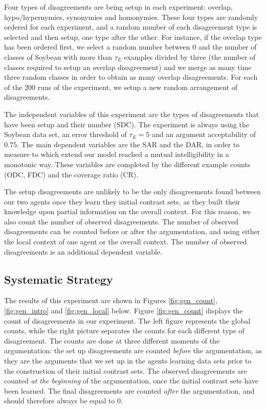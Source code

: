 Four types of disagreements are being setup in each experiment: overlap, hypo/hypernymies, synonymies and homonymies. These four types are randomly ordered for each experiment, and a random number of each disagreement type is selected and then setup, one type after the other. For instance, if the overlap type has been ordered first, we select a random number between 0 and the number of classes of Soybean with more than $\tau_{E}$ examples divided by three (the number of classes required to setup an overlap disagreement) and we merge as many time three random classes in order to obtain as many overlap disagreements. For each of the 200 runs of the experiment, we setup a new random arrangement of disagreements.

The independent variables of this experiment are the types of disagreements that have been setup and their number (SDC). The experiment is always using the Soybean data set, an error threshold of $\tau_{E} = 5$ and an argument acceptability of $0.75$.
The main dependent variables are the SAR and the DAR, in order to measure to which extend our model reached a mutual intelligibility in a monotonic way. These variables are completed by the different example counts (ODC, FDC) and the coverage ratio (CR).

The setup disagreements are unlikely to be the only disagreements found between our two agents once they learn they initial contrast sets, as they built their knowledge upon partial information on the overall context. For this reason, we also count the number of observed disagreements. The number of observed disagreements can be counted before or after the argumentation, and using either the local context of one agent or the overall context. The number of observed disagreements is an additional dependent variable.

\subsection{Systematic Strategy}

The results of this experiment are shown in Figures \ref{fig:gen_count}, \ref{fig:gen_intro} and \ref{fig:gen_local} below. Figure \ref{fig:gen_count} displays the count of disagreements in our experiment. The left figure represents the global counts, while the right picture separates the counts for each different type of disagreement. The counts are done at three different moments of the argumentation: the set up disagreements are counted \emph{before} the argumentation, as they are the arguments that we set up in the agents learning data sets prior to the construction of their initial contrast sets. The observed disagreements are counted \emph{at the beginning} of the argumentation, once the initial contrast sets have been learned. The final disagreements are counted \emph{after} the argumentation, and should therefore always be equal to 0.

